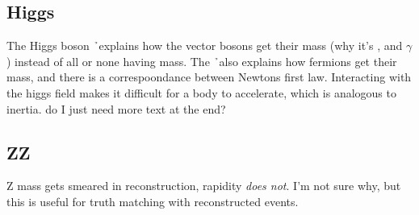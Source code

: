 \subsection{Higgs}
The Higgs boson \h\ explains how the vector bosons get their mass (why it's \W, \Z and $\gamma$) instead of all or none having mass. 
The \h\ also explains how fermions get their mass, and there is a correspoondance between Newtons first law. Interacting with the higgs field makes it difficult for a body to accelerate, which is analogous to inertia. do I just need more text at the end?
\subsection{ZZ}
Z mass gets smeared in reconstruction, rapidity \emph{does not}. I'm not sure why, but this is useful for truth matching with reconstructed events. 

